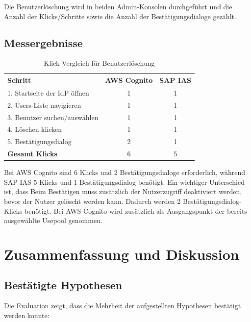Die Benutzerlöschung wird in beiden Admin-Konsolen durchgeführt und die Anzahl
der Klicks/Schritte sowie die Anzahl der Bestätigungsdialoge gezählt.

\subsection{Messergebnisse}

\begin{table}[h]
    \centering
    \begin{tabular}{|l|c|c|}
        \hline
        \textbf{Schritt} & \textbf{AWS Cognito}          & \textbf{SAP IAS}          \\
        \hline
        1. Startseite der IdP öffnen & 1 & 1 \\
        \hline
        2. Users-Liste navigieren    & 1     & 1     \\
        \hline
        3. Benutzer suchen/auswählen & 1     & 1     \\
        \hline
        4. Löschen klicken   & 1     & 1     \\
        \hline
        5. Bestätigungsdialog  & 2     & 1     \\
        \hline
        \textbf{Gesamt Klicks} & 6     & 5     \\
        \hline
    \end{tabular}
    \caption{Klick-Vergleich für Benutzerlöschung}
    \label{tab:h9_klicks}
\end{table}

Bei \ac{AWS} Cognito sind 6 Klicks und 2 Bestätigungsdialoge erforderlich, während \ac{SAP IAS} 5 Klicks und 1 Bestätigungsdialog benötigt.
Ein wichtiger Unterschied ist, dass Beim Bestätigen muss zusätzlich der Nutzerzugriff deaktiviert werden, bevor der Nutzer gelöscht werden kann. Dadurch werden 2 Bestätigungsdialog-Klicks benötigt.
Bei \ac{AWS} Cognito wird zusätzlich als Ausgangspunkt der bereits ausgewählte Usepool genommen.


\section{Zusammenfassung und Diskussion}

\subsection{Bestätigte Hypothesen}

Die Evaluation zeigt, dass die Mehrheit der aufgestellten Hypothesen bestätigt werden konnte:

